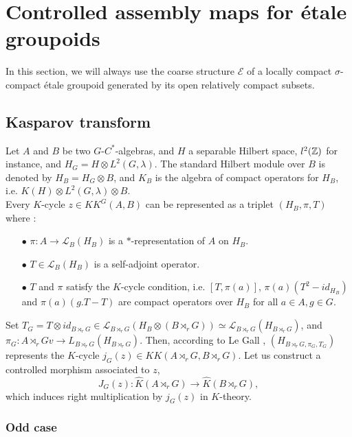 \section{Controlled assembly maps for étale groupoids}

In this section, we will always use the coarse structure $\mathcal E$ of a locally compact $\sigma$-compact étale groupoid generated by its open relatively compact subsets.

\subsection{Kasparov transform}

Let $A$ and $B$ be two $G$-$C^*$-algebras, and $H$ a separable Hilbert space, $l^2(\mathbb Z)$ for instance, and $H_G= H\otimes L^2(G,\lambda)$. The standard Hilbert module over $B$ is denoted by $H_B=H_G\otimes B$, and $K_B$ is the algebra of compact operators for $H_B$, i.e. $K(H)\otimes L^2(G,\lambda)\otimes B$. \\

Every $K$-cycle $z\in KK^G(A,B)$ can be represented as a triplet $(H_B, \pi, T)$ where :
\begin{itemize}
\item[$\bullet$]$\pi : A\rightarrow \mathcal L_B(H_B)$ is a $*$-representation of $A$ on $H_B$.
\item[$\bullet$]$T\in \mathcal L_B(H_B)$ is a self-adjoint operator.
\item[$\bullet$] $T$ and $\pi$ satisfy the $K$-cycle condition, i.e. $[T,\pi(a)]$, $\pi(a)(T^2-id_{H_B})$ and $\pi(a)(g.T-T)$ are compact operators over $H_B$ for all $a\in A, g\in G$.\\
\end{itemize}

Set $T_G= T\otimes id_{B\rtimes_r G}\in \mathcal L_{B\rtimes_r G}(H_B\otimes (B\rtimes_r G))\simeq \mathcal L_{B\rtimes_r G}(H_{B\rtimes_r G})$, and $\pi_G: A\rtimes_r G v\rightarrow L_{B\rtimes_r G}(H_{B\rtimes_r G})$. Then, according to Le Gall \cite{LeGall}, $(H_{B\rtimes_r G, \pi_G, T_G})$ represents the $K$-cycle $j_G(z)\in KK(A\rtimes_r G,B\rtimes_r G)$. Let us construct a controlled morphism associated to $z$,
\[J_G(z) : \hat K(A\rtimes_r G)\rightarrow \hat K(B\rtimes_r G), \]
which induces right multiplication by $j_G(z)$ in $K$-theory.\\

\subsubsection{Odd case}


